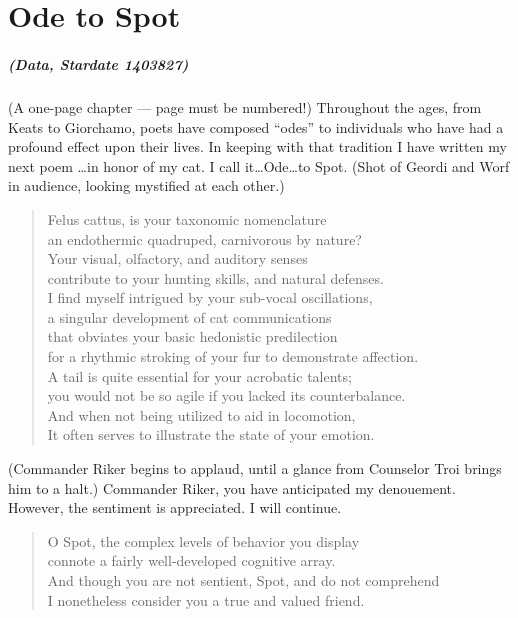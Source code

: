 \chapter{Ode to Spot}	\OnePageChapter         %

\noindent\paragraph{(Data, Stardate 1403827)}
(A one-page chapter --- page must be numbered!)
Throughout the ages, from Keats to Giorchamo, poets have
composed ``odes'' to individuals who have had a profound effect
upon their lives.  In keeping with that tradition
I have written my next poem \ldots in honor of my cat.
I call it\ldots{}Ode\ldots{}to Spot.
(Shot of Geordi and Worf in audience,
looking mystified at each other.)


\begin{quotation}
\noindent Felus cattus, is your taxonomic nomenclature \\
an endothermic quadruped, carnivorous by nature? \\
Your visual, olfactory, and auditory senses \\
contribute to your hunting skills, and natural defenses. \\
I find myself intrigued by your sub-vocal oscillations, \\
a singular development of cat communications \\
that obviates your basic hedonistic predilection \\
for a rhythmic stroking of your fur to demonstrate affection. \\
A tail is quite essential for your acrobatic talents; \\
you would not be so agile if you lacked its counterbalance. \\
And when not being utilized to aid in locomotion, \\
It often serves to illustrate the state of your emotion.
\end{quotation}


\noindent(Commander Riker begins to applaud, until a
glance from Counselor Troi brings him to a halt.)
Commander Riker, you have anticipated my denouement.
However, the sentiment is appreciated.  I will continue.


\begin{quotation}
\noindent O Spot, the complex levels of behavior you display \\
connote a fairly well-developed cognitive array. \\
And though you are not sentient, Spot, and do not comprehend \\
I nonetheless consider you a true and valued friend.
\end{quotation}
